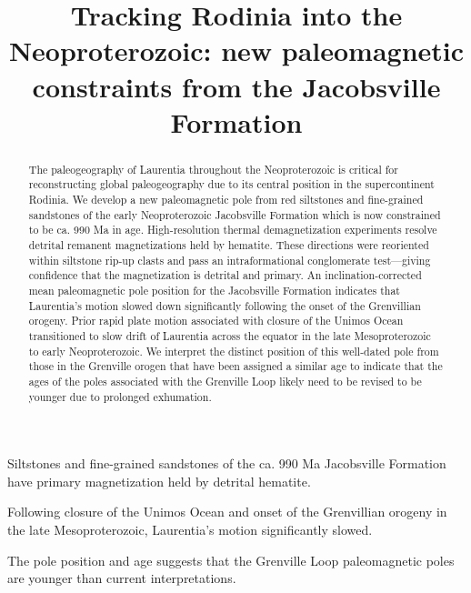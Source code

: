 \documentclass[draft]{agujournal2019}
\begin{document}
\title{Tracking Rodinia into the Neoproterozoic: new paleomagnetic constraints from the Jacobsville Formation}




\begin{keypoints}
\item Siltstones and fine-grained sandstones of the ca. 990 Ma Jacobsville Formation have primary magnetization held by detrital hematite.
\item Following closure of the Unimos Ocean and onset of the Grenvillian orogeny in the late Mesoproterozoic, Laurentia's motion significantly slowed.
\item The pole position and age suggests that the Grenville Loop paleomagnetic poles are younger than current interpretations.
\end{keypoints}

\begin{abstract}
The paleogeography of Laurentia throughout the Neoproterozoic is critical for reconstructing global paleogeography due to its central position in the supercontinent Rodinia. We develop a new paleomagnetic pole from red siltstones and fine-grained sandstones of the early Neoproterozoic Jacobsville Formation which is now constrained to be ca. 990 Ma in age. High-resolution thermal demagnetization experiments resolve detrital remanent magnetizations held by hematite. These directions were reoriented within siltstone rip-up clasts and pass an intraformational conglomerate test---giving confidence that the magnetization is detrital and primary. An inclination-corrected mean paleomagnetic pole position for the Jacobsville Formation indicates that Laurentia's motion slowed down significantly following the onset of the Grenvillian orogeny. Prior rapid plate motion associated with closure of the Unimos Ocean transitioned to slow drift of Laurentia across the equator in the late Mesoproterozoic to early Neoproterozoic. We interpret the distinct position of this well-dated pole from those in the Grenville orogen that have been assigned a similar age to indicate that the ages of the poles associated with the Grenville Loop likely need to be revised to be younger due to prolonged exhumation. 
\end{abstract}
\end{document}
